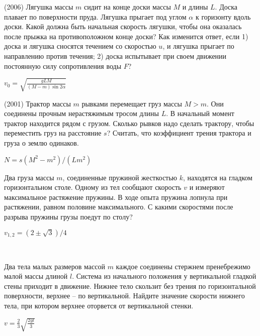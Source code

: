 \begin{ex}
(2006) Лягушка массы $m$ сидит на конце доски массы $M$ и длины $L$. Доска плавает по поверхности пруда. Лягушка прыгает под углом $\alpha$ к горизонту вдоль доски. Какой должна быть начальная скорость лягушки, чтобы она оказалась после прыжка на противоположном конце доски? Как изменится ответ, если 1) доска и лягушка сносятся течением со скоростью $u$, и лягушка прыгает по направлению против течения; 2) доска испытывает при своем движении постоянную силу сопротивления воды $F$?
\begin{ans}
$v_0 = \sqrt{\frac{gLM}{(M-m) \sin 2\alpha}}$
\end{ans}
\end{ex}

\begin{ex}
(2001) Трактор массы $m$ рывками перемещает груз массы $M>m$. Они соединены прочным нерастяжимым тросом длины $L$. В начальный момент трактор находится рядом с грузом. Сколько рывков надо сделать трактору, чтобы переместить груз на расстояние $s$?  Считать, что коэффициент трения трактора и груза о землю одинаков.
\begin{ans}
$N = s(M^2-m^2)/(Lm^2)$
\end{ans}
\end{ex}

\begin{ex}
Два груза массы $m$, соединенные пружиной жесткостью $k$, находятся на гладком горизонтальном столе. Одному из тел сообщают скорость $v$ и измеряют максимальное растяжение пружины. В ходе опыта пружина лопнула при растяжении, равном половине максимального. С какими скоростями после разрыва пружины грузы поедут по столу?
\begin{ans}
$v_{1,2} = (2\pm \sqrt{3})/4$
\end{ans}
\end{ex}

\begin{ex}
\hspace{0pt} \\
\begin{minipage}{.65\textwidth}
Два тела малых размеров массой $m$ каждое соединены стержнем пренебрежимо малой массы длиной $l$. Система из начального положения у вертикальной гладкой стены приходит в движение. Нижнее тело скользит без трения по горизонтальной поверхности, верхнее -- по вертикальной. Найдите значение скорости нижнего тела, при котором верхнее оторвется от вертикальной стенки.
\end{minipage}
\begin{minipage}{.35\textwidth}
\centering

\end{minipage}
\begin{ans}
$v = \frac{2}{3}\sqrt{\frac{2gl}{3}}$
\end{ans}
\end{ex}


